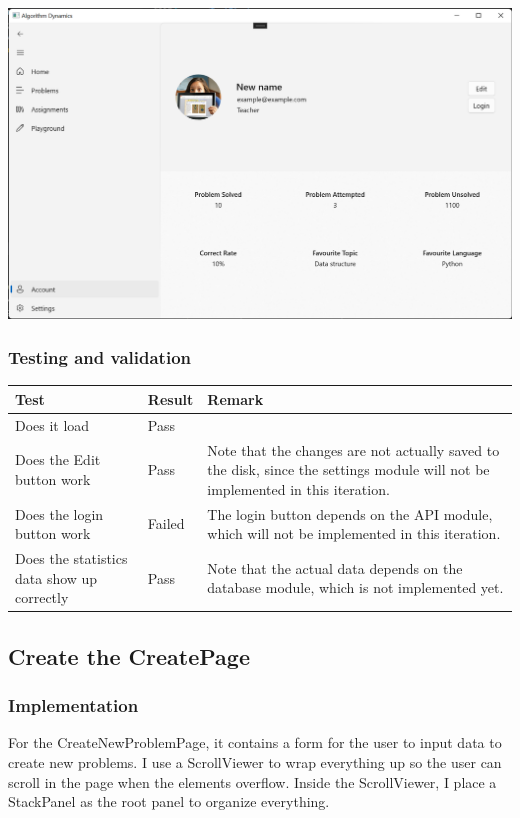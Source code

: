 \documentclass[a4paper]{report}
\begin{document}
\includegraphics[width=\textwidth, height=\textheight, keepaspectratio]{AccountPage-Saved}

\subsubsection{Testing and validation}

\begin{tabulary}{\linewidth}{|L|l|L|}
    \hline
    Test & Result & Remark \\
    \hline
    Does it load & Pass & \\
    \hline
    Does the Edit button work & Pass & Note that the changes are not actually saved to the disk, since the settings module will not be implemented in this iteration. \\
    \hline
    Does the login button work & Failed & The login button depends on the API module, which will not be implemented in this iteration. \\
    \hline
    Does the statistics data show up correctly & Pass & Note that the actual data depends on the database module, which is not implemented yet. \\
    \hline
\end{tabulary}

\subsection{Create the CreatePage}

\subsubsection{Implementation}

For the CreateNewProblemPage, it contains a form for the user to input data to create new problems. I use a ScrollViewer to wrap everything up so the user can scroll in the page when the elements overflow. Inside the ScrollViewer, I place a StackPanel as the root panel to organize everything.
\end{document}
